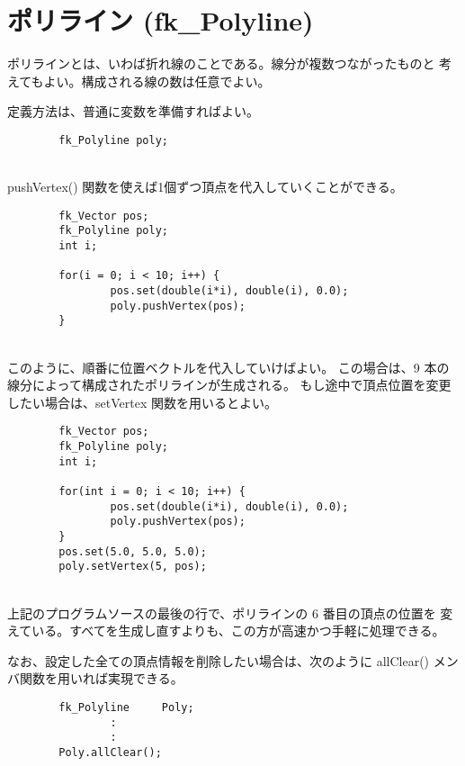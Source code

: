 \section{ポリライン (fk\_Polyline)}
ポリラインとは、いわば折れ線のことである。線分が複数つながったものと
考えてもよい。構成される線の数は任意でよい。

定義方法は、普通に変数を準備すればよい。
\\
\begin{screen}
\begin{verbatim}
        fk_Polyline poly;
\end{verbatim}
\end{screen}
~ \\
pushVertex() 関数を使えば1個ずつ頂点を代入していくことができる。
\\
\begin{breakbox}
\begin{verbatim}
        fk_Vector pos;
        fk_Polyline poly;
        int i;

        for(i = 0; i < 10; i++) {
                pos.set(double(i*i), double(i), 0.0);
                poly.pushVertex(pos);
        }
\end{verbatim}
\end{breakbox}
~ \\
このように、順番に位置ベクトルを代入していけばよい。
この場合は、9 本の線分によって構成されたポリラインが生成される。
もし途中で頂点位置を変更したい場合は、setVertex 関数を用いるとよい。
\\
\begin{breakbox}
\begin{verbatim}
        fk_Vector pos;
        fk_Polyline poly;
        int i;

        for(int i = 0; i < 10; i++) {
                pos.set(double(i*i), double(i), 0.0);
                poly.pushVertex(pos);
        }
        pos.set(5.0, 5.0, 5.0);
        poly.setVertex(5, pos);
\end{verbatim}
\end{breakbox}
~ \\
上記のプログラムソースの最後の行で、ポリラインの 6 番目の頂点の位置を
変えている。すべてを生成し直すよりも、この方が高速かつ手軽に処理できる。

なお、設定した全ての頂点情報を削除したい場合は、次のように
allClear() メンバ関数を用いれば実現できる。
\\
\begin{screen}
\begin{verbatim}
        fk_Polyline     Poly;
                :
                :
        Poly.allClear();
\end{verbatim}
\end{screen}
